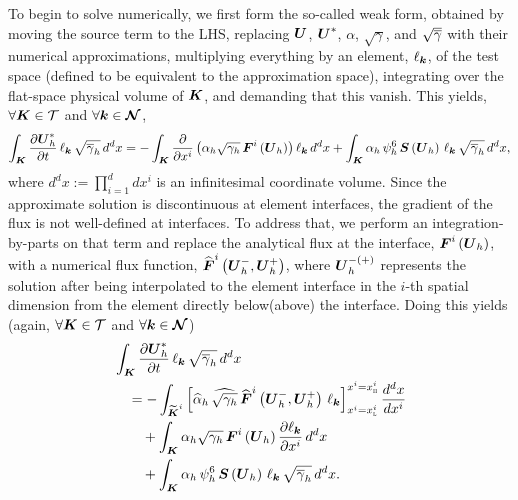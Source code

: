 To begin to solve  numerically, we first form the
so-called weak form, obtained by moving the source term to the LHS,
replacing $\boldsymbol{U}$, $\boldsymbol{U}^{*}$, $\alpha$, $\sqrt{\gamma}$,
and $\sqrt{\overline{\gamma}}$ with their numerical approximations,
multiplying everything by an element, $\ell_{\boldsymbol{k}}$,
of the test space
(defined to be equivalent to the approximation space),
integrating over the flat-space physical volume of $\boldsymbol{K}$,
and demanding that this vanish.
This yields, $\forall\boldsymbol{K}\in\mathcal{T}$
and $\forall\boldsymbol{k}\in\boldsymbol{\mathcal{N}}$,
\begin{align}
  \int_{\boldsymbol{K}}\frac{\partial\boldsymbol{U}_{h}^{*}}{\partial t}\,
  \ell_{\boldsymbol{k}}\,\sqrt{\overline{\gamma}_{h}}\,d^{d}x
  =-\int_{\boldsymbol{K}}\frac{\partial}{\partial x^{i}}
  \left(\alpha_{h}\sqrt{\gamma_{h}}\,\boldsymbol{F}^{i}\left(\boldsymbol{U}_{h}\right)\right)
  \ell_{\boldsymbol{k}}\,d^{d}x
  +\int_{\boldsymbol{K}}\alpha_{h}\,\psi_{h}^{6}\,\boldsymbol{S}\left(\boldsymbol{U}_{h}\right)\,
  \ell_{\boldsymbol{k}}\,\sqrt{\overline{\gamma}_{h}}\,d^{d}x,
\end{align}
where $d^{d}x:=\prod_{i=1}^{d}dx^{i}$ is an infinitesimal coordinate volume.
Since the approximate solution is discontinuous at element interfaces,
the gradient of the flux is not well-defined at interfaces.
To address that, we perform an integration-by-parts on that term
and replace the analytical flux at the interface,
$\boldsymbol{F}^{i}\left(\boldsymbol{U}_{h}\right)$,
with a numerical flux function,
$\widehat{\boldsymbol{F}}^{i}\left(\boldsymbol{U}_{h}^{-},\boldsymbol{U}_{h}^{+}\right)$,
where $\boldsymbol{U}_{h}^{-(+)}$ represents the solution after being interpolated
to the element interface in the $i$-th spatial dimension from the element
directly below(above) the interface.
Doing this yields
(again, $\forall\boldsymbol{K}\in\mathcal{T}$ and
$\forall\boldsymbol{k}\in\boldsymbol{\mathcal{N}}$)
\begin{align}
\begin{split}
  &\int_{\boldsymbol{K}}\frac{\partial\boldsymbol{U}_{h}^{*}}{\partial t}\,
  \ell_{\boldsymbol{k}}\,\sqrt{\overline{\gamma}_{h}}\,d^{d}x \\
  &\hspace{1em}=-\int_{\widetilde{\boldsymbol{K}}^{i}}
  \left[\widehat{\alpha}_{h}\,
  \widehat{\sqrt{\gamma_{h}}}\,
  \widehat{\boldsymbol{F}}^{i}\left(\boldsymbol{U}_{h}^{-},\boldsymbol{U}_{h}^{+}\right)
  \,\ell_{\boldsymbol{k}}
  \right]^{x^{i}=x^{i}_{\textsc{h}}}_{x^{i}=x^{i}_{\textsc{l}}}
  \frac{d^{d}x}{dx^{i}} \\
  &\hspace{2em}+\int_{\boldsymbol{K}}
  \alpha_{h}\sqrt{\gamma_{h}}\,\boldsymbol{F}^{i}\left(\boldsymbol{U}_{h}\right)
  \frac{\partial\ell_{\boldsymbol{k}}}{\partial x^{i}}\,d^{d}x \\
  &\hspace{2em}+\int_{\boldsymbol{K}}
  \alpha_{h}\,\psi_{h}^{6}\,\boldsymbol{S}\left(\boldsymbol{U}_{h}\right)\,
  \ell_{\boldsymbol{k}}\,\sqrt{\overline{\gamma}_{h}}\,d^{d}x.
  \label{eq.weak1}
\end{split}
\end{align}
